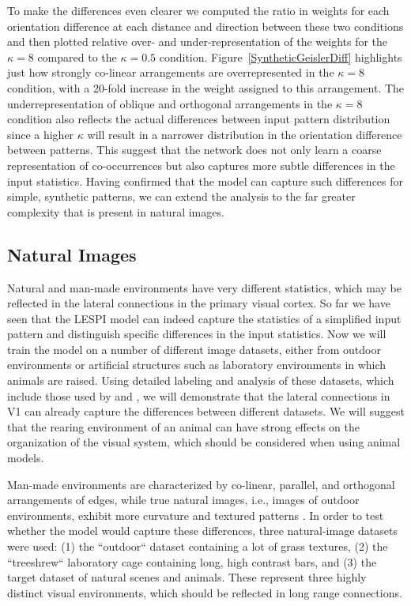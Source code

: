 To make the differences even clearer we computed the ratio in weights
for each orientation difference at each distance and direction between
these two conditions and then plotted relative over- and
under-representation of the weights for the $\kappa=8$ compared to the
$\kappa=0.5$ condition. Figure~\ref{SyntheticGeislerDiff} highlights
just how strongly co-linear arrangements are overrepresented in the
$\kappa=8$ condition, with a 20-fold increase in the weight assigned
to this arrangement. The underrepresentation of oblique and orthogonal
arrangements in the $\kappa=8$ condition also reflects the actual
differences between input pattern distribution since a higher $\kappa$
will result in a narrower distribution in the orientation difference
between patterns. This suggest that the network does not only learn a
coarse representation of co-occurrences but also captures more subtle
differences in the input statistics. Having confirmed that the model
can capture such differences for simple, synthetic patterns, we can
extend the analysis to the far greater complexity that is present in
natural images.

\subsection{Natural Images}

Natural and man-made environments have very different statistics,
which may be reflected in the lateral connections in the primary
visual cortex. So far we have seen that the LESPI model can indeed
capture the statistics of a simplified input pattern and distinguish
specific differences in the input statistics. Now we will train the
model on a number of different image datasets, either from outdoor
environments or artificial structures such as laboratory environments
in which animals are raised. Using detailed labeling and analysis of
these datasets, which include those used by \cite{Perrinet2015} and
\cite{Serre2007}, we will demonstrate that the lateral connections in
V1 can already capture the differences between different datasets.  We
will suggest that the rearing environment of an animal can have strong
effects on the organization of the visual system, which should be
considered when using animal models.

Man-made environments are characterized by co-linear, parallel, and
orthogonal arrangements of edges, while true natural images, i.e.,
images of outdoor environments, exhibit more curvature and textured
patterns \citep{Perrinet2015}. In order to test whether the model
would capture these differences, three natural-image datasets were
used: (1) the ``outdoor`` dataset containing a lot of grass textures,
(2) the ``treeshrew`` laboratory cage containing long, high contrast
bars, and (3) the \cite{Serre2007} target dataset of natural scenes
and animals. These represent three highly distinct visual
environments, which should be reflected in long range connections.

